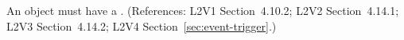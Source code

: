 An \Event object must have a .  (References: L2V1
Section~4.10.2; L2V2 Section~4.14.1; L2V3
Section~4.14.2; L2V4 Section~\ref{sec:event-trigger}.)

